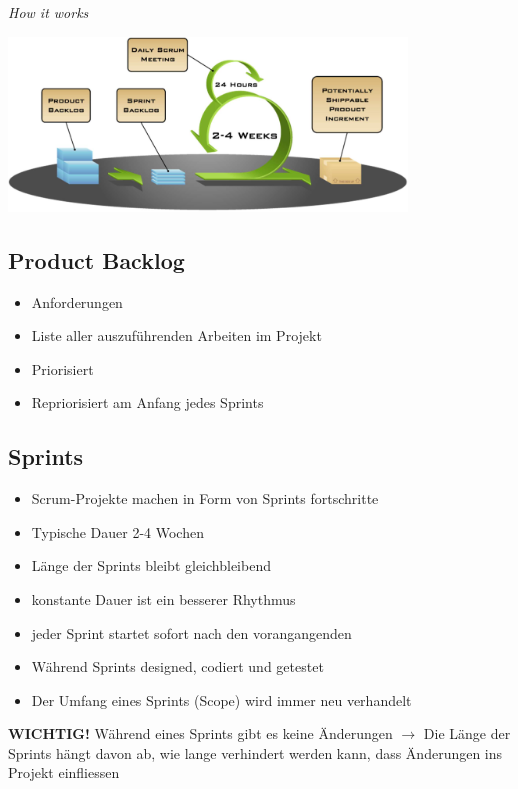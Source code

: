 \documentclass{report}
\newenvironment{Figure}
	{\par\medskip\noindent\minipage{\linewidth}}
	{\endminipage\par\medskip}
\theoremstyle{definition}
\theoremstyle{example}
\begin{document}
\textit{How it works}
\begin{Figure}
\centering
\includegraphics[width=400px]{img/HowScrumWorks.png}
	\label{fig:How Scrum works}
\end{Figure}

\subsection{Product Backlog}
\begin{itemize}
	\item Anforderungen
	\item Liste aller auszuführenden Arbeiten im Projekt
	\item Priorisiert
	\item Repriorisiert am Anfang jedes Sprints
\end{itemize}

\subsection{Sprints}
\begin{itemize}
	\item Scrum-Projekte machen in Form von Sprints fortschritte
	\item Typische Dauer 2-4 Wochen
	\item Länge der Sprints bleibt gleichbleibend
	\item konstante Dauer ist ein besserer Rhythmus
	\item jeder Sprint startet sofort nach den vorangangenden
	\item Während Sprints designed, codiert und getestet
	\item Der Umfang eines Sprints (Scope) wird immer neu verhandelt
\end{itemize}
\textbf{WICHTIG!} Während eines Sprints gibt es keine Änderungen $\rightarrow$ Die Länge der Sprints hängt davon ab, wie lange verhindert werden kann, dass Änderungen ins Projekt einfliessen
\end{document}
